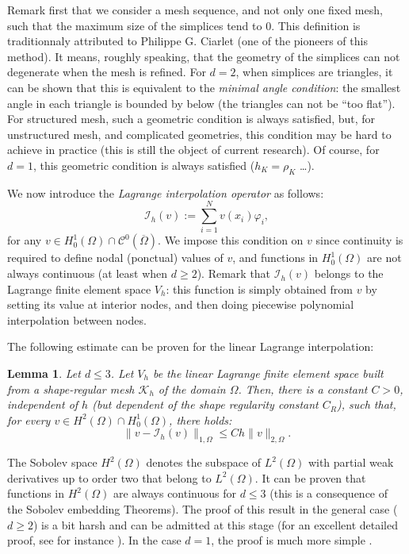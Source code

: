 \documentclass{article}
\newtheorem{lemma}{Lemma}
\begin{document}
Remark first that we consider a mesh sequence, and not only one fixed mesh, such that the maximum size of the simplices tend to $0$. This definition is traditionnaly attributed to Philippe G. Ciarlet (one of the pioneers of this method). It means, roughly speaking, that the geometry of the simplices can not degenerate when the mesh is refined. For $d=2$, when simplices are triangles, it can be shown that this is equivalent to the \emph{minimal angle condition}: the smallest angle in each triangle is bounded by below (the triangles can not be ``too flat''). For structured mesh, such a geometric condition is always satisfied, but, for unstructured mesh, and complicated geometries, this condition may be hard to achieve in practice (this is still the object of current research). Of course, for $d=1$, this geometric condition is always satisfied ($h_K = \rho_K$ \dots).

\medskip

We now introduce the
\emph{Lagrange interpolation operator} as follows:
\[
\mathcal{I}_h (v) := \sum_{i=1}^N v(x_i) \varphi_i,
\]
for any $v \in H^1_0(\Omega) \cap \mathcal{C}^0 (\overline{\Omega})$. We impose this condition on $v$ since continuity is required to define nodal (ponctual) values of $v$, and functions in $H^1_0(\Omega)$ are not always continuous (at least when $d\geq2$). Remark that $\mathcal{I}_h (v)$ belongs to the Lagrange finite element space $V_h$: this function is simply obtained from $v$ by setting its value at interior nodes, and then doing piecewise polynomial interpolation between nodes.

\medskip

The following estimate can be proven for the linear Lagrange interpolation:

\begin{lemma}
\label{lemmaInterpLagrange}
Let $d\leq3$. Let $V_h$ be the linear Lagrange finite element space built from a shape-regular mesh $\mathcal{K}_h$ of the domain $\Omega$. Then, there is a constant $C>0$, independent of $h$ (but dependent of the shape regularity constant $C_R$), such that, for every $v \in H^2(\Omega) \cap H^1_0(\Omega)$, there holds:
\[
\| v - \mathcal{I}_h(v) \|_{1,\Omega}
\leq C h \| v \|_{2,\Omega}. 
\]
\end{lemma}
The Sobolev space $H^2(\Omega)$ denotes the subspace of $L^2(\Omega)$ with partial weak derivatives up to order two that belong to $L^2(\Omega)$. It can be proven that functions in $H^2(\Omega)$ are always continuous for $d\leq3$ (this is a consequence of the Sobolev embedding Theorems). The proof of this result in the general case ($d \geq 2$) is a bit harsh and can be admitted at this stage 
(for an excellent detailed proof, see for instance \cite{raviart83}).
In the case $d=1$, the proof is much more simple \cite{gander18b}. %
\end{document}
